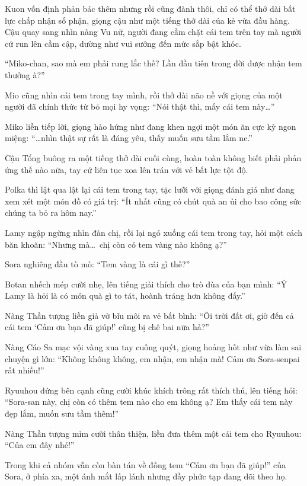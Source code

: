 \documentclass[../main.tex]{subfiles}
\begin{document}
Kuon vốn định phản bác thêm nhưng rồi cũng đành thôi, chỉ có thể thở dài bất lực chấp nhận số phận, giọng cậu như một tiếng thở dài của kẻ vừa đầu hàng. Cậu quay sang nhìn nàng Vu nữ, người đang cầm chặt cái tem trên tay mà người cứ run lên cầm cập, dường như vui sướng đến mức sắp bật khóc.

``Miko-chan, sao mà em phải rung lắc thế? Lần đầu tiên trong đời được nhận tem thưởng à?''

Mio cũng nhìn cái tem trong tay mình, rồi thở dài não nề với giọng của một người đã chính thức từ bỏ mọi hy vọng: ``Nói thật thì, mấy cái tem này\dots''

Miko liền tiếp lời, giọng hào hứng như đang khen ngợi một món ăn cực kỳ ngon miệng: ``\dots nhìn thật sự rất là đáng yêu, thấy muốn sưu tầm lắm ne.''

Cậu Tổng buông ra một tiếng thở dài cuối cùng, hoàn toàn không biết phải phản ứng thế nào nữa, tay cứ liên tục xoa lên trán với vẻ bất lực tột độ.

Polka thì lật qua lật lại cái tem trong tay, tặc lưỡi với giọng đánh giá như đang xem xét một món đồ có giá trị: ``Ít nhất cũng có chút quà an ủi cho bao công sức chúng ta bỏ ra hôm nay.''

Lamy ngập ngừng nhìn đàn chị, rồi lại ngó xuống cái tem trong tay, hỏi một cách băn khoăn: ``Nhưng mà\dots\ chị còn có tem vàng nào không ạ?''

Sora nghiêng đầu tò mò: ``Tem vàng là cái gì thế?''

Botan nhếch mép cười nhẹ, lên tiếng giải thích cho trò đùa của bạn mình: ``Ý Lamy là hỏi là có món quà gì to tát, hoành tráng hơn không đấy.''

Nàng Thần tượng liền giả vờ bĩu môi ra vẻ bất bình: ``Ôi trời đất ơi, giờ đến cả cái tem `Cảm ơn bạn đã giúp!' cũng bị chê bai nữa hả?''

Nàng Cáo Sa mạc vội vàng xua tay cuống quýt, giọng hoảng hốt như vừa làm sai chuyện gì lớn: ``Không không không, em nhận, em nhận mà! Cảm ơn Sora-senpai rất nhiều!''

Ryuuhou đứng bên cạnh cũng cười khúc khích trông rất thích thú, lên tiếng hỏi: ``Sora-san này, chị còn có thêm tem nào cho em không ạ? Em thấy cái tem này đẹp lắm, muốn sưu tầm thêm!''

Nàng Thần tượng mỉm cười thân thiện, liền đưa thêm một cái tem cho Ryuuhou: ``Của em đây nhé!''

\il

Trong khi cả nhóm vẫn còn bàn tán về đống tem ``Cảm ơn bạn đã giúp!'' của Sora, ở phía xa, một ánh mắt lấp lánh nhưng đầy phức tạp đang dõi theo họ.
\end{document}
